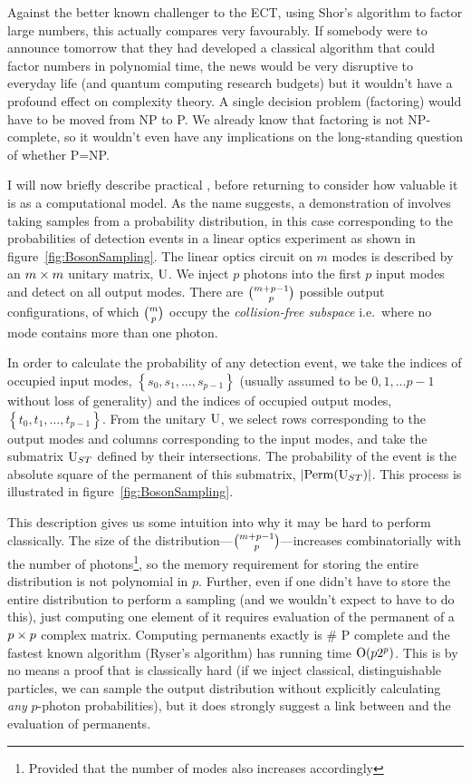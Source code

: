 Against the better known challenger to the ECT, using Shor's algorithm to factor
large numbers, this actually compares very favourably. If somebody were to
announce tomorrow that they had developed a classical algorithm that could
factor numbers in polynomial time, the news would be very disruptive to
everyday life (and quantum computing research budgets) but it wouldn't have a
profound effect on complexity theory. A single decision problem (factoring)
would have to be moved from NP to P. We already know that factoring is not
NP-complete, so it wouldn't even have any implications on the long-standing
question of whether P=NP.

I will now briefly describe practical \bosonsampling{}, before returning to
consider how valuable it is as a computational model. As the name suggests, a
demonstration of \bosonsampling{} involves taking samples from a probability
distribution, in this case corresponding to the probabilities of detection
events in a linear optics experiment as shown in figure~\ref{fig:BosonSampling}.
The linear optics circuit on \(m\) modes is described by an \(m \times m\) unitary
matrix, \(\mathrm{U}\). We inject \(p\) photons into the first \(p\) input modes
and detect on all output modes. There are \({m+p-1}\choose{p}\) possible output
configurations, of which \({m}\choose{p}\) occupy the \emph{collision-free
subspace} i.e.\ where no mode contains more than one photon.

In order to calculate the probability of any detection event, we take the
indices of occupied input modes, \(\left\{ s_{0}, s_{1}, \dots, s_{p-1} \right\}
\) (usually assumed to be \(0, 1, \dots p-1\) without loss of generality) and
the indices of occupied output modes, \(\left\{ t_{0}, t_{1}, \dots, t_{p-1}
\right\}\). From the unitary \(\mathrm{U}\), we select rows corresponding to the
output modes and columns corresponding to the input modes, and take the
submatrix \(\mathrm{U}_{ST}\) defined by their intersections. The probability of
the event is the absolute square of the permanent of this submatrix, \(\left|
\mathrm{Perm} \!\left( \mathrm{U}_{ST} \right)\right| \). This process is illustrated in
figure~\ref{fig:BosonSampling}.

This description gives us some intuition into why it may be hard to perform
\bosonsampling{} classically. The size of the distribution---\( {m+p-1}\choose{p}
\)---increases combinatorially with the number of photons\footnote{Provided that
the number of modes also increases accordingly}, so the memory requirement for
storing the entire distribution is not polynomial in \(p\). Further, even if one
didn't have to store the entire distribution to perform a sampling (and we
wouldn't expect to have to do this), just computing one element of it requires
evaluation of the permanent of a \(p \times p\) complex matrix. Computing
permanents exactly is \# P complete \cite{valiant} and the fastest known
algorithm (Ryser's algorithm) has running time \(\mathrm{O} \!\left( p 2^{p} \right)\). This is
by no means a proof that \bosonsampling{} is classically hard (if we inject
classical, distinguishable particles, we can sample the output distribution
without explicitly calculating \emph{any} \(p\)-photon probabilities), but it
does strongly suggest a link between \bosonsampling{} and the evaluation of
permanents.

